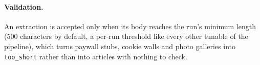\paragraph{Validation.} An extraction is accepted only when its body
reaches the run's minimum length (500 characters by default, a per-run
threshold like every other tunable of the pipeline), which turns
paywall stubs, cookie walls and photo galleries into
\texttt{too\_short} rather than into articles with nothing to check.
